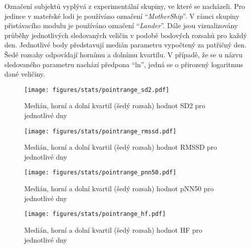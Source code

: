 Označení subjektů vyplývá z experimentální skupiny, ve které se nacházeli. Pro
jedince v mateřské lodi je používáno označení \enquote{\textit{MotherShip}}. V
rámci skupiny přistávacího modulu je používáno označení
\enquote{\textit{Lander}}. Dále jsou vizualizovány průběhy jednotlivých
sledovaných veličin v podobě bodových rozsahů pro každý den. Jednotlivé body
představují medián parametru vypočtený za patřičný den. Šedé rozsahy odpovídají
hornímu a dolnímu kvartilu. V případě, že se u názvu sledovaného parametru
nachází předpona \enquote{ln}, jedná se o přirozený logaritmus dané veličiny.

\begin{figure}[h]
    \begin{center}
        \texttt{[image: figures/stats/pointrange\_sd2.pdf]}
        \caption{Medián, horní a dolní kvartil (šedý rozsah) hodnot SD2 pro jednotlivé dny}
        \label{fig:results_pointrange_sd2}
    \end{center}
    \vspace{-10mm}
\end{figure}
\begin{figure}[h]
    \begin{center}
        \texttt{[image: figures/stats/pointrange\_rmssd.pdf]}
        \caption{Medián, horní a dolní kvartil (šedý rozsah) hodnot RMSSD pro jednotlivé dny}
        \label{fig:results_pointrange_rmssd}
    \end{center}
    \vspace{-10mm}
\end{figure}
\begin{figure}[h]
    \begin{center}
        \texttt{[image: figures/stats/pointrange\_pnn50.pdf]}
        \caption{Medián, horní a dolní kvartil (šedý rozsah) hodnot pNN50 pro jednotlivé dny}
        \label{fig:results_pointrange_pnn50}
    \end{center}
    \vspace{-20mm}
\end{figure}

\begin{figure}[h]
    \begin{center}
        \texttt{[image: figures/stats/pointrange\_hf.pdf]}
        \caption{Medián, horní a dolní kvartil (šedý rozsah) hodnot HF pro jednotlivé dny}
        \label{fig:results_pointrange_hf}
    \end{center}
\end{figure}

